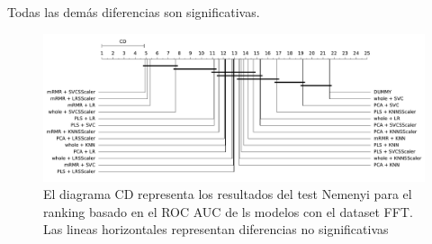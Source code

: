 \documentclass[a4paper,oneside,11pt,leqno]{article}
\begin{document}
	Todas las demás diferencias son significativas.
	
	\begin{figure}[h]
		\includegraphics[width=\linewidth]{stat_results_fft.pdf}
		\caption{El diagrama CD representa los resultados del test Nemenyi para el ranking basado en el ROC AUC de ls modelos con el dataset FFT. Las lineas horizontales representan diferencias no significativas}
		\label{fig:stats_fig_fft}
	\end{figure}
\end{document}
